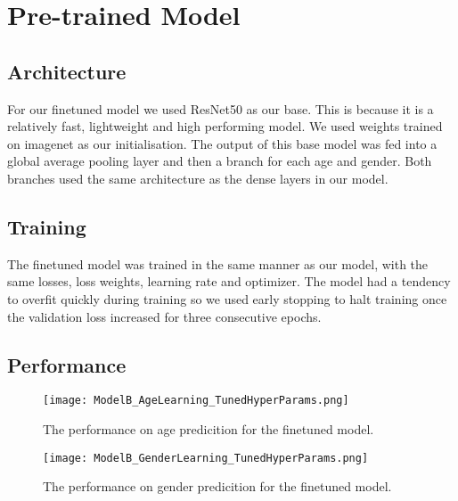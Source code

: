 
\section{Pre-trained Model}
\subsection{Architecture}
For our finetuned model we used ResNet50 as our base. This is because it is a relatively fast,
lightweight and high performing model. We used weights trained on imagenet as our initialisation.
The output of this base model was fed into a global average pooling layer and then a branch
 for each age and gender. Both branches used the same architecture as the dense layers in our 
 model.  

 \subsection{Training}
 The finetuned model was trained in the same manner as our model, with the same losses, loss weights,
 learning rate and optimizer. The model had a tendency to overfit quickly during training
 so we used early stopping to halt training once the validation loss increased for three 
 consecutive epochs. 
 
 \subsection{Performance}


\begin{figure}
    \centering
    \texttt{[image: ModelB\_AgeLearning\_TunedHyperParams.png]}
    \caption{\label{fig:ModelBPerformanceAge} The performance on age predicition for the finetuned model.}
\end{figure}


\begin{figure}
    \centering
    \texttt{[image: ModelB\_GenderLearning\_TunedHyperParams.png]}
    \caption{\label{fig:ModelBPerformanceGender} The performance on gender predicition for the finetuned model.}
\end{figure}